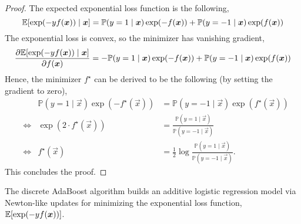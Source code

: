 \begin{proof}
    The expected exponential loss function is the following, \[
        \mathbb{E}[\exp(-y f(\bm{x})) \mid \bm{x}] = \mathbb{P}(y=1 \mid \bm{x}) \exp(-f(\bm{x})) + \mathbb{P}(y=-1 \mid \bm{x}) \exp(f(\bm{x}))                   \\
    \]
    The exponential loss is convex, so the minimizer has vanishing gradient, \[
        \pdv{\mathbb{E}[\exp(-y f(\bm{x})) \mid \bm{x}]}{f(\bm{x})} = -\mathbb{P}(y=1 \mid \bm{x}) \exp(-f(\bm{x})) + \mathbb{P}(y=-1 \mid \bm{x}) \exp(f(\bm{x}))
    \]
    Hence, the minimizer $f^\star$ can be derived to be the following (by setting the gradient to
    zero),
    \begin{align*}
         &      & \mathbb{P}(y=1 \mid \vec{x}) \exp(-f^\star(\vec{x})) & = \mathbb{P}(y=-1 \mid \vec{x}) \exp(f^\star(\vec{x}))                                 \\
         & \iff & \exp(2 \cdot f^\star(\vec{x}))                       & = \frac{\mathbb{P}(y=1 \mid \vec{x})}{\mathbb{P}(y=-1 \mid \vec{x})}                   \\
         & \iff & f^\star(\vec{x})                                     & = \frac{1}{2} \log \frac{\mathbb{P}(y=1 \mid \vec{x})}{\mathbb{P}(y=-1 \mid \vec{x})}.
    \end{align*}
    This concludes the proof.
\end{proof}

\begin{theorem}
    The discrete AdaBoost algorithm builds an additive logistic regression model via Newton-like
    updates for minimizing the exponential loss function, $\mathbb{E}[\exp(-y f(\bm{x}))]$.
\end{theorem}

